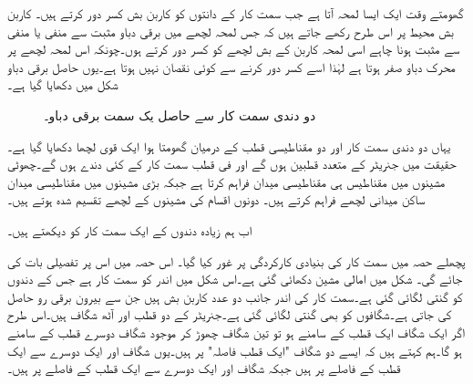 گھومتے وقت ایک ایسا لمحہ آتا ہے جب سمت کار کے  دانتوں کو کاربن بش  کسر دور کرتے ہیں۔ کاربن بش  محیط پر اس طرح رکھے جاتے ہیں کہ جس لمحہ لچھے میں برقی دباو مثبت سے منفی یا منفی سے مثبت ہونا چاہے اسی لمحہ کاربن کے بش لچھے کو کسر دور کرتے ہوں۔چونکہ اس لمحہ  لچھے پر محرک  دباو صفر ہوتا ہے لہٰذا اسے کسر دور کرنے سے کوئی نقصان نہیں ہوتا ہے۔یوں حاصل برقی دباو شکل   میں دکھایا گیا ہے۔
\begin{figure}
\centering
\caption{دو دندی سمت کار سے حاصل یک سمت  برقی دباو۔}
\label{شکل_یکسمتی_دو_دندوں_کا_سمتکار}
\end{figure}


یہاں دو دندی سمت کار اور دو مقناطیسی قطب کے درمیان گھومتا ہوا ایک قوی لچھا دکھایا گیا ہے۔حقیقت میں جنریٹر کے متعدد قطبین ہوں گے اور فی قطب  سمت کار کے کئی دندے ہوں گے۔چھوٹی مشینوں میں مقناطیس ہی مقناطیسی میدان  فراہم کرتا ہے جبکہ بڑی مشینوں میں مقناطیسی میدان ساکن میدانی لچھے فراہم کرتے ہیں۔ دونوں اقسام کی مشینوں  کے لچھے تقسیم شدہ ہوتے ہیں۔

اب ہم زیادہ دندوں کے ایک سمت کار کو دیکھتے ہیں۔

پچھلے حصہ میں سمت کار کی بنیادی کارکردگی پر غور کیا گیا۔ اس حصہ میں اس پر تفصیلی بات کی جائے گی۔ شکل  میں امالی مشین دکھائی گئی ہے۔اس شکل میں اندر کو سمت کار ہے جس کے دندوں کو گنتی لگائی گئی ہے۔سمت کار کی اندر جانب دو عدد  کاربن بش ہیں جن سے   بیرون  برقی رو  حاصل کی جاتی ہے۔شگافوں کو بھی گنتی لگائی گئی  ہے۔جنریٹر کے دو قطب اور آٹھ شگاف ہیں۔اس طرح اگر ایک شگاف ایک قطب کے سامنے ہو تو تین شگاف چھوڑ کر موجود شگاف دوسرے قطب کے سامنے ہو گا۔ہم کہتے ہیں کہ ایسے دو شگاف "ایک قطب فاصلہ" پر ہیں۔یوں شگاف  اور  ایک دوسرے سے ایک قطب کے فاصلے پر ہیں جبکہ    شگاف  اور  ایک دوسرے سے ایک قطب کے فاصلے پر ہیں۔

